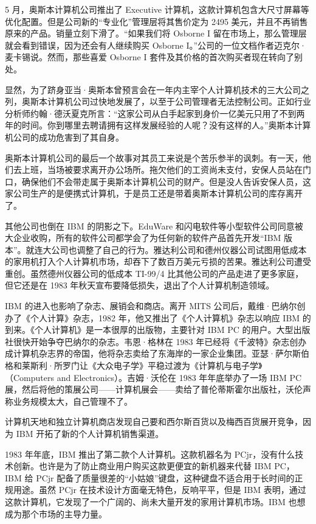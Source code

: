 \documentclass[12pt,UTF8]{ctexbook}
\begin{document}
5 月，奥斯本计算机公司推出了 Executive 计算机，这款计算机包含大尺寸屏幕等优化配置。但是公司新的“专业化”管理层将其售价定为 2495 美元，并且不再销售原来的产品。销量立刻下滑了。“如果我们将 Osborne I 留在市场上，那么管理层就会看到错误，因为还会有人继续购买 Osborne I。”公司的一位文档作者迈克尔·麦卡锡说。然而，那些喜爱 Osborne I 套件及其价格的首次购买者现在转向了别处。

显然，为了跻身亚当·奥斯本曾预言会在一年内主宰个人计算机技术的三大公司之列，奥斯本计算机公司过快地发展了，以至于公司管理者无法控制公司。正如行业分析师约翰·德沃夏克所言：“这家公司从白手起家到身价一亿美元只用了不到两年的时间。你到哪里去聘请拥有这样发展经验的人呢？没有这样的人。”奥斯本计算机公司的成功危害到了其自身。

奥斯本计算机公司的最后一个故事对其员工来说是个苦乐参半的讽刺。有一天，他们去上班，当场被要求离开办公场所。拖欠他们的工资尚未支付，安保人员站在门口，确保他们不会带走属于奥斯本计算机公司的财产。但是没人告诉安保人员，这家公司生产的是便携式计算机，于是员工还是带着奥斯本计算机公司的库存离开了。

其他公司也倒在 IBM 的阴影之下。EduWare 和闪电软件等小型软件公司同意被大企业收购，所有的软件公司都学会了为任何新的软件产品首先开发“IBM 版本”。就连大公司也调整了自己的行为。雅达利公司和德州仪器公司试图用低成本的家用机打入个人计算机市场，却吞下了数百万美元亏损的苦果。雅达利公司遭受重创。虽然德州仪器公司的低成本 TI-99/4 比其他公司的产品走进了更多家庭，但它还是在 1983 年秋天宣布要降低损失，退出了个人计算机制造领域。

IBM 的进入也影响了杂志、展销会和商店。离开 MITS 公司后，戴维·巴纳尔创办了《个人计算》杂志，1982 年，他又推出了《个人计算机》杂志以响应 IBM 的到来。《个人计算机》是一本很厚的出版物，主要针对 IBM PC 的用户。大型出版社很快开始争夺巴纳尔的杂志。韦恩·格林在 1983 年已经将《千波特》杂志创办成计算机杂志界的帝国，他将杂志卖给了东海岸的一家企业集团。亚瑟·萨尔斯伯格和莱斯利·所罗门让《大众电子学》平稳过渡为《计算机与电子学》（Computers and Electronics）。吉姆·沃伦在 1983 年年底举办了一场 IBM PC 展，然后将他的策展公司——计算机展会——卖给了普伦蒂斯霍尔出版社，沃伦声称业务规模太大，自己管理不了。

计算机天地和独立计算机商店发现自己要和西尔斯百货以及梅西百货展开竞争，因为 IBM 开拓了新的个人计算机销售渠道。

1983 年年底，IBM 推出了第二款个人计算机。这款机器名为 PCjr，没有什么技术创新。也许是为了防止商业用户购买这款更便宜的新机器来代替 IBM PC，IBM 给 PCjr 配备了质量很差的“小姑娘”键盘，这种键盘不适合用于长时间的正规用途。虽然 PCjr 在技术设计方面毫无特色，反响平平，但是 IBM 表明，通过这款计算机，它发现了一个广阔的、尚未大量开发的家用计算机市场。IBM 也想成为那个市场的主导力量。
\end{document}
